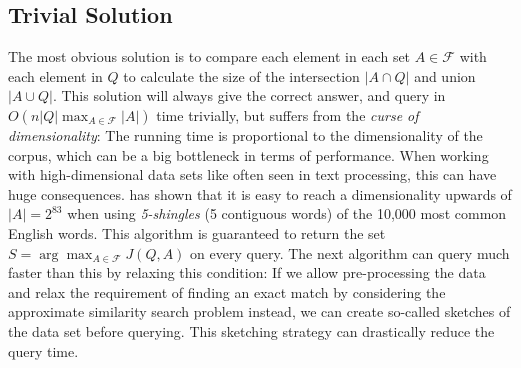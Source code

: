 \subsection{Trivial Solution}
The most obvious solution is to compare each element in each set $A\in \mathcal{F}$ with each element in $Q$ to calculate the size of the intersection $|A\cap Q|$ and union $|A \cup Q|$. This solution will always give the correct answer, and query in $O(n|Q|\max_{A\in \mathcal{F}}|A|)$ time trivially, but suffers from the \textit{curse of dimensionality}: The running time is proportional to the dimensionality of the corpus, which can be a big bottleneck in terms of performance.
When working with high-dimensional data sets like often seen in text processing, this can have huge consequences. \citet{li2011hashing} has shown that it is easy to reach a dimensionality upwards of $|A|=2^{83}$ when using \textit{5-shingles} (5 contiguous words) of the 10,000 most common English words.
This algorithm is guaranteed to return the set $S=\arg\max_{A \in \mathcal{F}}J(Q,A)$ on every query. The next algorithm can query much faster than this by relaxing this condition: If we allow pre-processing the data and relax the requirement of finding an exact match by considering the approximate similarity search problem instead, we can create so-called sketches of the data set before querying. This sketching strategy can drastically reduce the query time.
